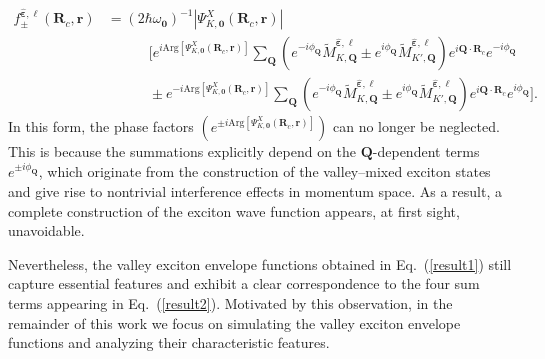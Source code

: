 \begin{equation}
\begin{aligned}
f_{\pm}^{\hat{\boldsymbol{\varepsilon}}, \ell}(\boldsymbol{R}_c, \boldsymbol{r})
& = \left( 2 \hbar \omega_{\boldsymbol{0}}\right)^{-1} \left|\Psi^{X}_{K,\boldsymbol{0}}(\boldsymbol{R}_c, \boldsymbol{r})\right| \\
& \hspace{3em}
\Bigg[
e^{i\mathrm{Arg}\!\left[\Psi^{X}_{K,\boldsymbol{0}}(\boldsymbol{R}_c,\boldsymbol{r})\right]}
\sum_{\boldsymbol{Q}}
\left( e^{-i\phi_{\boldsymbol{Q}}} \tilde{M}^{\hat{\boldsymbol{\varepsilon}}, \ell}_{K,\boldsymbol{Q}} 
\pm
e^{i\phi_{\boldsymbol{Q}}} \tilde{M}^{\hat{\boldsymbol{\varepsilon}}, \ell}_{K',\boldsymbol{Q}} \right)
e^{i\boldsymbol{Q}\cdot\boldsymbol{R}_c} e^{-i\phi_{\boldsymbol{Q}}} \\
& \hspace{3em} \pm 
e^{-i\mathrm{Arg}\!\left[\Psi^{X}_{K,\boldsymbol{0}}(\boldsymbol{R}_c,\boldsymbol{r})\right]}
\sum_{\boldsymbol{Q}}
\left( e^{-i\phi_{\boldsymbol{Q}}} \tilde{M}^{\hat{\boldsymbol{\varepsilon}}, \ell}_{K,\boldsymbol{Q}} 
\pm
e^{i\phi_{\boldsymbol{Q}}} \tilde{M}^{\hat{\boldsymbol{\varepsilon}}, \ell}_{K',\boldsymbol{Q}} \right)
e^{i\boldsymbol{Q}\cdot\boldsymbol{R}_c} e^{i\phi_{\boldsymbol{Q}}}
\Bigg].
\end{aligned}
\label{result2}
\end{equation}
In this form, the phase factors $\left(e^{\pm i \mathrm{Arg}\!\left[\Psi^{X}_{K,\boldsymbol{0}}(\boldsymbol{R}_c,\boldsymbol{r})\right]} \right)$ can no longer be neglected. This is because the summations explicitly depend on the $\boldsymbol{Q}$-dependent terms $e^{\pm i\phi_{\boldsymbol{Q}}}$, which originate from the construction of the valley--mixed exciton states and give rise to nontrivial interference effects in momentum space. As a result, a complete construction of the exciton wave function appears, at first sight, unavoidable. 

Nevertheless, the valley exciton envelope functions obtained in Eq.~(\ref{result1}) still capture essential features and exhibit a clear correspondence to the four sum terms appearing in Eq.~(\ref{result2}). Motivated by this observation, in the remainder of this work we focus on simulating the valley exciton envelope functions and analyzing their characteristic features.

